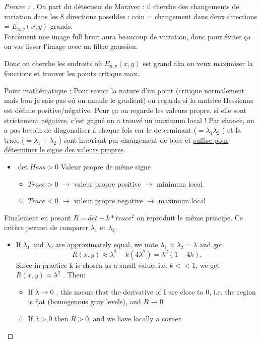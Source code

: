 \documentclass{article}
\theoremstyle{plain}%
\theoremstyle{definition}
\theoremstyle{remark}
\begin{document}
\begin{proof}[Preuve : ]
    On part du détecteur de Moravec : il cherche des changements de variation dans les 8 directions possibles : coin = changement dans deux directions = $ E_{u,v}(x,y) $ grands. \\
    Forcément une image full bruit aura beaucoup de variation, donc pour éviter ça on vas lisser l'image avec un filtre gaussien.

    Donc on cherche les endroits où $ E_{u,v}(x,y) $ est grand aka on veux maximiser la fonctions et trouver les points critique max.

    Point mathématique : Pour savoir la nature d'un point (critique normalement mais bon je sais pas où on annule le gradient) on regarde si la matrice Hessienne est définie positive/négative. Pour ça on regarde les valeurs propre, si elle sont strictement négative, c'est gagné on a trouvé un maximum local ! Par chance, on a pas besoin de diagonaliser à chaque fois car le determinant ($ = \lambda _1 \lambda _2 $ ) et la trace ($ = \lambda _1 + \lambda _2 $ ) sont invariant par changement de base et \href{http://serge.mehl.free.fr/anx/extremum_hesse.html}{suffise pour déterminer le signe des valeurs propres}. \begin{itemize}
        \item $ \det Hess > 0 $ Valeur propre de même signe \begin{itemize}
            \item $ Trace > 0 $ $\rightarrow$ valeur propre positive $\rightarrow$ minimum local
            \item $ Trace < 0 $ $\rightarrow$ valeur propre negative $\rightarrow$ maximum local
        \end{itemize}
    \end{itemize}

    Finalement en posant $ R = det - k*trace^2 $ on reproduit le même principe. Ce critère permet de comparer $ \lambda _1 $ et $ \lambda _2 $.
    \begin{itemize}
        \item If $ \lambda _1 $  and $ \lambda _2 $  are approximately equal, we note $ \lambda _1 \approx  \lambda _2 = \lambda $ and get 
        \[
        R(x,y) \approx \lambda ^2 - k(4 \lambda ^2) = \lambda ^2 (1 - 4k)
        .\]
        Since in practice k is chosen as a small value, i.e. $ k << 1$, we get $ R(x,y) \approx \lambda ^2 $  . Then:
        \begin{itemize}
            \item If $ \lambda \to 0 $ , this means that the derivative of I are close to 0, i.e. the region is flat (homogenous gray levels), and $ R \to 0 $
            \item If $ \lambda > 0 $  then $R > 0$, and we have locally a corner.
        \end{itemize}


\end{itemize}
\end{proof}
\end{document}
